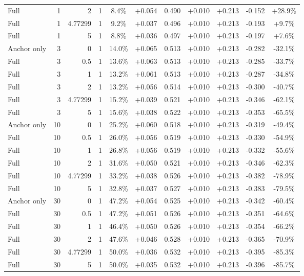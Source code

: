 \begin{table}[htbp]
\begin{tabular}{lrrrccccccc}
Full & 1 & 2 & 1 & 8.4\% & +0.054 & 0.490 & +0.010 & +0.213 & -0.152 & +28.9\% \\
Full & 1 & 4.77299 & 1 & 9.2\% & +0.037 & 0.496 & +0.010 & +0.213 & -0.193 & +9.7\% \\
Full & 1 & 5 & 1 & 8.8\% & +0.036 & 0.497 & +0.010 & +0.213 & -0.197 & +7.6\% \\
Anchor only & 3 & 0 & 1 & 14.0\% & +0.065 & 0.513 & +0.010 & +0.213 & -0.282 & -32.1\% \\
Full & 3 & 0.5 & 1 & 13.6\% & +0.063 & 0.513 & +0.010 & +0.213 & -0.285 & -33.7\% \\
Full & 3 & 1 & 1 & 13.2\% & +0.061 & 0.513 & +0.010 & +0.213 & -0.287 & -34.8\% \\
Full & 3 & 2 & 1 & 13.2\% & +0.056 & 0.514 & +0.010 & +0.213 & -0.300 & -40.7\% \\
Full & 3 & 4.77299 & 1 & 15.2\% & +0.039 & 0.521 & +0.010 & +0.213 & -0.346 & -62.1\% \\
Full & 3 & 5 & 1 & 15.6\% & +0.038 & 0.522 & +0.010 & +0.213 & -0.353 & -65.5\% \\
Anchor only & 10 & 0 & 1 & 25.2\% & +0.060 & 0.518 & +0.010 & +0.213 & -0.319 & -49.4\% \\
Full & 10 & 0.5 & 1 & 26.0\% & +0.056 & 0.519 & +0.010 & +0.213 & -0.330 & -54.9\% \\
Full & 10 & 1 & 1 & 26.8\% & +0.056 & 0.519 & +0.010 & +0.213 & -0.332 & -55.6\% \\
Full & 10 & 2 & 1 & 31.6\% & +0.050 & 0.521 & +0.010 & +0.213 & -0.346 & -62.3\% \\
Full & 10 & 4.77299 & 1 & 33.2\% & +0.038 & 0.526 & +0.010 & +0.213 & -0.382 & -78.9\% \\
Full & 10 & 5 & 1 & 32.8\% & +0.037 & 0.527 & +0.010 & +0.213 & -0.383 & -79.5\% \\
Anchor only & 30 & 0 & 1 & 47.2\% & +0.054 & 0.525 & +0.010 & +0.213 & -0.342 & -60.4\% \\
Full & 30 & 0.5 & 1 & 47.2\% & +0.051 & 0.526 & +0.010 & +0.213 & -0.351 & -64.6\% \\
Full & 30 & 1 & 1 & 46.4\% & +0.050 & 0.526 & +0.010 & +0.213 & -0.354 & -66.2\% \\
Full & 30 & 2 & 1 & 47.6\% & +0.046 & 0.528 & +0.010 & +0.213 & -0.365 & -70.9\% \\
Full & 30 & 4.77299 & 1 & 50.0\% & +0.036 & 0.532 & +0.010 & +0.213 & -0.395 & -85.3\% \\
Full & 30 & 5 & 1 & 50.0\% & +0.035 & 0.532 & +0.010 & +0.213 & -0.396 & -85.7\% \\

\end{tabular}
\end{table}
